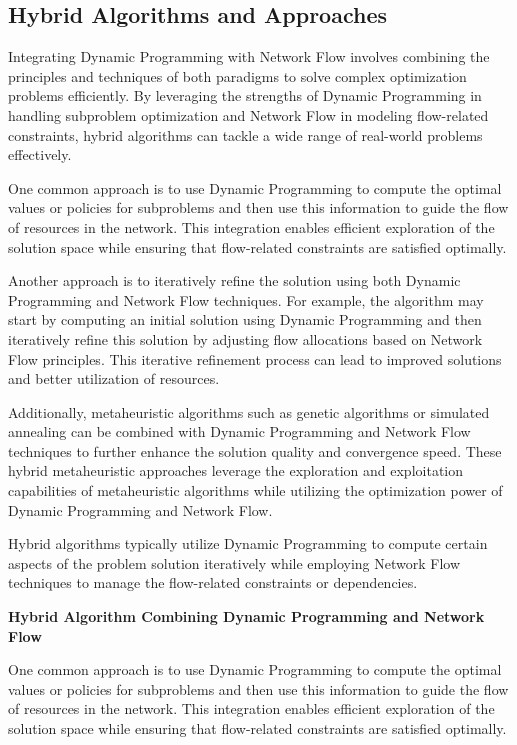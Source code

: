 \documentclass[12pt]{book} %
\begin{document}
\subsection{Hybrid Algorithms and Approaches}

Integrating Dynamic Programming with Network Flow involves combining the principles and techniques of both paradigms to solve complex optimization problems efficiently. By leveraging the strengths of Dynamic Programming in handling subproblem optimization and Network Flow in modeling flow-related constraints, hybrid algorithms can tackle a wide range of real-world problems effectively.

One common approach is to use Dynamic Programming to compute the optimal values or policies for subproblems and then use this information to guide the flow of resources in the network. This integration enables efficient exploration of the solution space while ensuring that flow-related constraints are satisfied optimally.

Another approach is to iteratively refine the solution using both Dynamic Programming and Network Flow techniques. For example, the algorithm may start by computing an initial solution using Dynamic Programming and then iteratively refine this solution by adjusting flow allocations based on Network Flow principles. This iterative refinement process can lead to improved solutions and better utilization of resources.

Additionally, metaheuristic algorithms such as genetic algorithms or simulated annealing can be combined with Dynamic Programming and Network Flow techniques to further enhance the solution quality and convergence speed. These hybrid metaheuristic approaches leverage the exploration and exploitation capabilities of metaheuristic algorithms while utilizing the optimization power of Dynamic Programming and Network Flow.


Hybrid algorithms typically utilize Dynamic Programming to compute certain aspects of the problem solution iteratively while employing Network Flow techniques to manage the flow-related constraints or dependencies.


\textbf{Hybrid Algorithm Combining Dynamic Programming and Network Flow}

One common approach is to use Dynamic Programming to compute the optimal values or policies for subproblems and then use this information to guide the flow of resources in the network. This integration enables efficient exploration of the solution space while ensuring that flow-related constraints are satisfied optimally.
\end{document}
